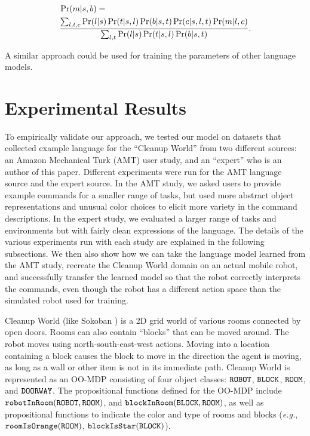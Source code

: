 \documentclass[conference]{IEEEtran}
\begin{document}
{
\footnotesize
\begin{equation}
\vspace{-1em}
\begin{split}
& \Pr(m | s, b) = \\ & \frac{\sum_{l,t,c} \Pr(l | s) \Pr(t | s, l) \Pr(b | s, t) \Pr(c | s, l, t) \Pr(m | l, c)}{\sum_{l,t} \Pr(l | s) \Pr(t | s, l) \Pr(b | s, t)}.
\end{split}
\end{equation}
}

\noindent A similar approach could be used for training the parameters of other language models.

\section{Experimental Results}
To empirically validate our approach, we tested our model on datasets that collected example language for the ``Cleanup World'' from two different sources: an Amazon Mechanical Turk (AMT) user study, and an ``expert'' who is an author of this paper. Different experiments were run for the AMT language source and the expert source. In the AMT study, we asked users to provide example commands for a smaller range of tasks, but used more abstract object representations and unusual color choices to elicit more variety in the command descriptions. In the expert study, we evaluated a larger range of tasks and environments but with fairly clean expressions of the language. The details of the various experiments run with each study are explained in the following subsections. We then also show how we can take the language model learned from the AMT study, recreate the Cleanup World domain on an actual mobile robot, and successfully transfer the learned model so that the robot correctly interprets the commands, even though the robot has a different action space than the simulated robot used for training.

Cleanup World (like Sokoban \cite{junghanns1997sokoban}) is a 2D grid world of various rooms connected by open doors. Rooms can also contain ``blocks'' that can be moved around. The robot moves using north-south-east-west actions. Moving into a location containing a block causes the block to move in the direction the agent is moving, as long as a wall or other item is not in its immediate path. Cleanup World is represented as an OO-MDP consisting of four object classes: ${\tt ROBOT}$, ${\tt BLOCK}$, ${\tt ROOM}$, and ${\tt DOORWAY}$. %
The propositional functions defined for the OO-MDP include ${\tt robotInRoom}({\tt ROBOT}, {\tt ROOM})$, and ${\tt blockInRoom}({\tt BLOCK}, {\tt ROOM})$, as well as propositional functions to indicate the color and type of rooms and blocks (\emph{e.g.}, ${\tt roomIsOrange}({\tt ROOM})$, ${\tt blockIsStar}({\tt BLOCK})$).
\end{document}
